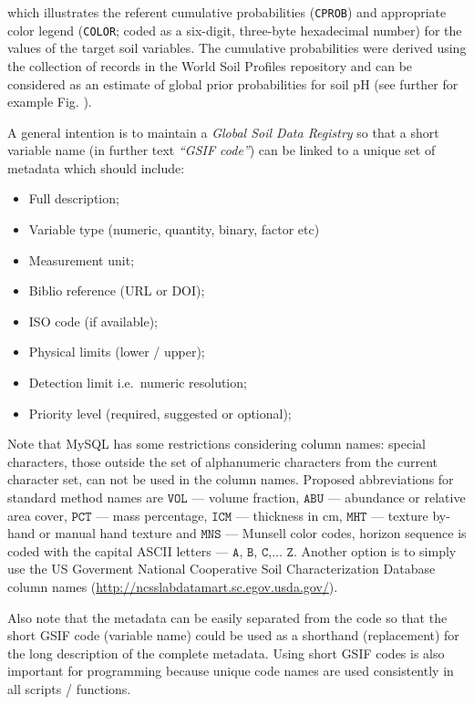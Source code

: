 \documentclass[graybox,natbib,nospthms,UStrade]{svmono}
\begin{document}
which illustrates the referent cumulative probabilities (\texttt{CPROB}) and
appropriate color legend (\texttt{COLOR}; coded as a six-digit, three-byte
hexadecimal number) for the values of the target soil variables. The cumulative
probabilities were derived using the collection of records in the World
Soil Profiles repository and can be considered as an estimate of global prior
probabilities for soil pH (see further for example
Fig. ).

A general intention is to maintain a \emph{Global Soil Data
Registry} so that a short variable name (in further text \emph{``GSIF code''})
can be linked to a unique set of metadata which should include:

\begin{itemize}
\item
  Full description;
\item
  Variable type (numeric, quantity, binary, factor etc)
\item
  Measurement unit;
\item
  Biblio reference (URL or DOI);
\item
  ISO code (if available);
\item
  Physical limits (lower / upper);
\item
  Detection limit i.e.~numeric resolution;
\item
  Priority level (required, suggested or optional);
\end{itemize}

Note that MySQL has some restrictions considering column names: special
characters, those outside the set of alphanumeric characters from the
current character set, can not be used in the column names. Proposed
abbreviations for standard method names are \(\mathtt{VOL}\) --- volume
fraction, \(\mathtt{ABU}\) --- abundance or relative area cover,
\(\mathtt{PCT}\) --- mass percentage, \(\mathtt{ICM}\) --- thickness in cm,
\(\mathtt{MHT}\) --- texture by-hand or manual hand texture and
\(\mathtt{MNS}\) --- Munsell color codes, horizon sequence is coded with the
capital ASCII letters --- \(\mathtt{A}\), \(\mathtt{B}\),
\(\mathtt{C}\),\(\ldots\) \(\mathtt{Z}\). Another option is to simply use
the US Goverment National Cooperative Soil Characterization Database column names (\url{http://ncsslabdatamart.sc.egov.usda.gov/}).

Also note that the metadata can be easily separated from the code so
that the short GSIF code (variable name) could be used as a shorthand (replacement)
for the long description of the complete metadata. Using short GSIF
codes is also important for programming because unique code names are
used consistently in all scripts / functions.
\end{document}
